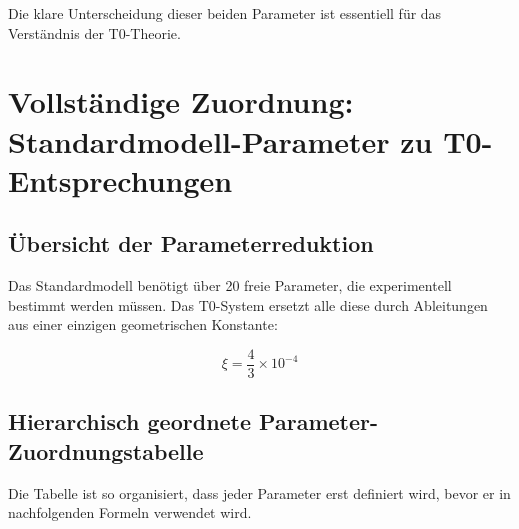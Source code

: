 \documentclass[12pt,a4paper]{article}
\theoremstyle{definition}
\begin{document}
	Die klare Unterscheidung dieser beiden Parameter ist essentiell f\"ur das Verst\"andnis der T0-Theorie.
\section{Vollständige Zuordnung: Standardmodell-Parameter zu T0-Entsprechungen}
\label{sec:sm_t0_mapping}

\subsection{Übersicht der Parameterreduktion}
\label{subsec:parameter_overview}

Das Standardmodell benötigt über 20 freie Parameter, die experimentell bestimmt werden müssen. Das T0-System ersetzt alle diese durch Ableitungen aus einer einzigen geometrischen Konstante:

\begin{equation}
	\boxed{\xi = \frac{4}{3} \times 10^{-4}}
\end{equation}

\subsection{Hierarchisch geordnete Parameter-Zuordnungstabelle}
\label{subsec:hierarchical_mapping}

Die Tabelle ist so organisiert, dass jeder Parameter erst definiert wird, bevor er in nachfolgenden Formeln verwendet wird.
\end{document}
